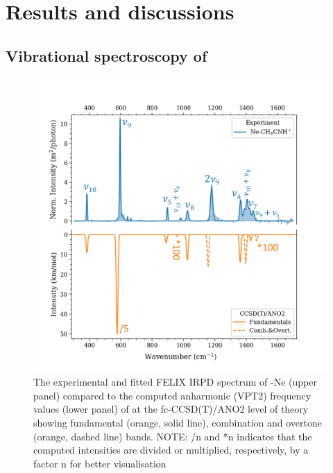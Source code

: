 \section{Results and discussions}
\subsection{Vibrational spectroscopy of \texorpdfstring{\pa}{CH3CNH+}}

\begin{figure}
	\centering
		\includegraphics[scale=.7]{chapters/CH3CNH+/figures/felix_1_rev.pdf}
	\caption{The experimental and fitted FELIX IRPD spectrum of \pan-Ne (upper panel) compared to the computed anharmonic (VPT2) frequency values (lower panel) of \pa at the fc-CCSD(T)/ANO2 level of theory showing fundamental (orange, solid line), combination and overtone (orange, dashed line) bands. NOTE: /n and *n indicates that the computed intensities are divided or multiplied, respectively, by a  factor n for better visualisation }
	\label{FIG:felix_1}
	
\end{figure}

